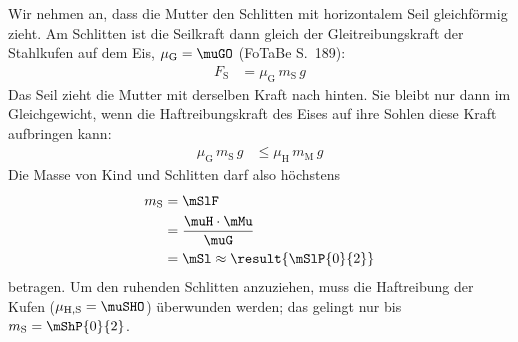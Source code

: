 \begin{center}
\end{center}

Wir nehmen an, dass die Mutter den Schlitten mit horizontalem Seil gleichförmig zieht. Am Schlitten ist die Seilkraft dann gleich der Gleitreibungskraft der Stahlkufen auf dem Eis, $\mu_\mathrm{G} = \muGO$ (FoTaBe S.~189):
\begin{align}
 F_\mathrm{S} &= \mu_\mathrm{G}\,m_\mathrm{S}\,g
\end{align}
Das Seil zieht die Mutter mit derselben Kraft nach hinten. Sie bleibt nur dann im Gleichgewicht, wenn die Haftreibungskraft des Eises auf ihre Sohlen diese Kraft aufbringen kann:
\begin{align}
 \mu_\mathrm{G}\,m_\mathrm{S}\,g &\leq \mu_\mathrm{H}\,m_\mathrm{M}\,g
\end{align}
Die Masse von Kind und Schlitten darf also höchstens
\begin{align}
 m_\mathrm{S} &= \mSlF \\
   &= \frac{\muH\cdot\mMu}{\muG} \\
   &= \mSl \approx \result{\mSlP{0}{2}}
\end{align}
betragen. Um den ruhenden Schlitten anzuziehen, muss die Haftreibung der Kufen ($\mu_\mathrm{H,S} = \muSHO$) überwunden werden; das gelingt nur bis $m_\mathrm{S} = \mShP{0}{2}$.
